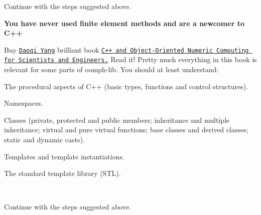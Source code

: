 \begin{DoxyItemize}
\begin{DoxyItemize}
\item Continue with the steps suggested above. ~\newline
~\newline

\end{DoxyItemize}
\item {\bfseries You have never used finite element methods and are a newcomer to C++}~\newline
~\newline

\begin{DoxyItemize}
\item Buy \href{http://www.math.wayne.edu/~yang/}{\tt Daoqi Yang} brilliant book \href{http://www.springeronline.com/sgw/cda/frontpage/0,11855,4-40007-22-2105335-0,00.html?changeHeader=true}{\tt C++ and Object-\/\+Oriented Numeric Computing for Scientists and Engineers.} Read it! Pretty much everything in this book is relevant for some parts of {\ttfamily oomph-\/lib}. You should at least understand\+: ~\newline
~\newline

\begin{DoxyItemize}
\item The procedural aspects of C++ (basic types, functions and control structures).
\item Namespaces.
\item Classes (private, protected and public members; inheritance and multiple inheritance; virtual and pure virtual functions; base classes and derived classes; static and dynamic casts).
\item Templates and template instantiations.
\item The standard template library (S\+TL).
\end{DoxyItemize}~\newline
~\newline

\item Continue with the steps suggested above. ~\newline
~\newline

\end{DoxyItemize}
\end{DoxyItemize}

~\newline
~\newline
 



